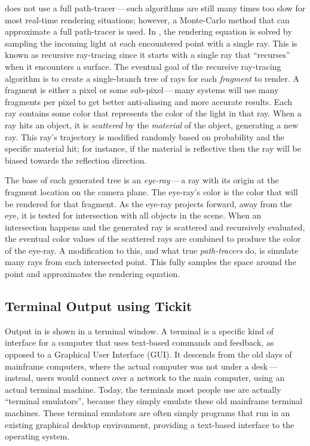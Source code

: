 \name{} does not use a full path-tracer\,---\,such algorithms are still many times too slow for most real-time rendering situations; however, a Monte-Carlo method that can approximate a full path-tracer is used.
In \name{}, the rendering equation is solved by sampling the incoming light at each encountered point with a single ray.
This is known as recursive ray-tracing since it starts with a single ray that ``recurses'' when it encounters a surface.
The eventual goal of the recursive ray-tracing algorithm is to create a single-branch tree of rays for each {\it fragment\/} to render.
A fragment is either a pixel or some sub-pixel\,---\,many systems will use many fragments per pixel to get better anti-aliasing and more accurate results.
Each ray contains some color that represents the color of the light in that ray.
When a ray hits an object, it is {\it scattered\/} by the {\it material\/} of the object, generating a new ray.
This ray's trajectory is modified randomly based on probability and the specific material hit; for instance, if the material is reflective then the ray will be biased towards the reflection direction.

The base of each generated tree is an {\it eye-ray\/}\,---\,a ray with its origin at the fragment location on the camera plane.
The eye-ray's color is the color that will be rendered for that fragment.
As the eye-ray projects forward, away from the eye, it is tested for intersection with all objects in the scene.
When an intersection happens and the generated ray is scattered and recursively evaluated, the eventual color values of the scattered rays are combined to produce the color of the eye-ray.
A modification to this, and what true {\it path-tracers\/} do, is simulate many rays from each intersected point. This fully samples the space around the point and approximates the rendering equation.

\subsection{Terminal Output using Tickit}
\label{ch:intro:overview:libtickit}

Output in \name{} is shown in a terminal window.
A terminal is a specific kind of interface for a computer that uses text-based commands and feedback, as opposed to a Graphical User Interface (GUI).
It descends from the old days of mainframe computers, where the actual computer was not under a desk\,---\,instead, users would connect over a network to the main computer, using an actual terminal machine.
Today, the terminals most people use are actually ``terminal emulators'', because they simply emulate these old mainframe terminal machines.
These terminal emulators are often simply programs that run in an existing graphical desktop environment, providing a text-based interface to the operating system.

